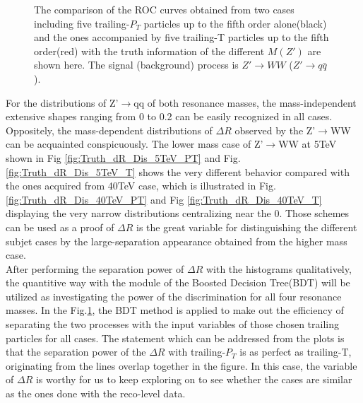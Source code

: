 \begin{figure}
\begin{center}
\end{center}
\caption{The comparison of the ROC curves obtained from two cases including five trailing-$P_{T}$ particles up to the fifth order alone(black) and the ones accompanied by five trailing-T particles up to the fifth order(red) with  the truth information of the different $M(Z')$ are shown here. The signal (background) process is $Z'\rightarrow WW$ ($Z' \rightarrow q\bar{q}$).\label{fig:Truth_dR_BDT}}
\end{figure}


For the distributions of Z'$\rightarrow$qq of both resonance masses, the mass-independent extensive shapes ranging from 0 to 0.2 can be easily recognized in all cases. Oppositely, the mass-dependent distributions of $\Delta R$ observed by the Z'$\rightarrow$WW can be acquainted conspicuously. The lower mass case of Z'$\rightarrow$WW at 5TeV shown in Fig \ref{fig:Truth_dR_Dis_5TeV_PT} and Fig.\ref{fig:Truth_dR_Dis_5TeV_T} shows the very different behavior compared with the ones acquired from 40TeV case, which is illustrated in Fig.\ref{fig:Truth_dR_Dis_40TeV_PT} and Fig \ref{fig:Truth_dR_Dis_40TeV_T} displaying the very narrow distributions centralizing near the 0. Those schemes can be used as a proof of $\Delta R$ is the great variable for distinguishing the different subjet cases by the large-separation appearance obtained from the higher mass case. \\

After performing the separation power of $\Delta R$ with the histograms qualitatively, the quantitive way with the module of the Boosted Decision Tree(BDT) will be utilized as investigating the power of the discrimination for all four resonance masses. In the Fig.\ref{fig:Truth_dR_BDT}, the BDT method is applied to make out the efficiency of separating the two processes with the input variables of those chosen trailing particles for all cases. The statement which can be addressed from the plots is that the separation power of the $\Delta R$ with trailing-$P_{T}$ is as perfect as trailing-T, originating from the lines overlap together in the figure. In this case, the variable of $\Delta R$ is worthy for us to keep exploring on to see whether the cases are similar as the ones done with the reco-level data.\\

